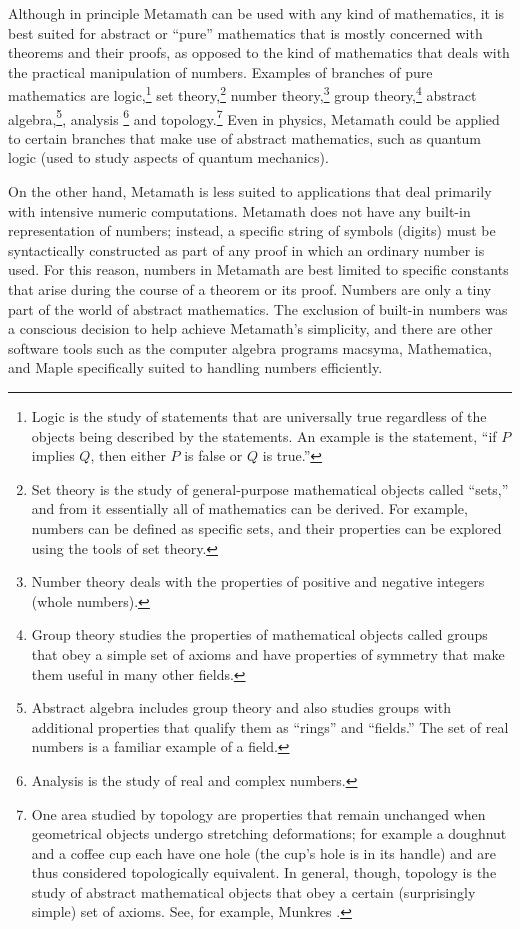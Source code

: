 Although in principle Metamath can be used with any
kind of mathematics, it is best suited for abstract or ``pure'' mathematics
that is mostly concerned with theorems and their proofs, as opposed to the
kind of mathematics that deals with the practical manipulation of numbers.
Examples of branches of pure mathematics are logic,\footnote{Logic
is the study of statements that are universally true regardless of the objects
being described by the statements.  An example is the statement, ``if $P$
implies $Q$, then either $P$ is false or $Q$ is true.''} set theory,\footnote{Set theory is the study of general-purpose mathematical objects called
``sets,'' and from it essentially all of mathematics can be derived.  For
example, numbers can be defined as specific sets, and their properties
can be explored using the tools of set theory.} number theory,\footnote{Number theory deals with the properties of positive and
negative integers (whole numbers).} group theory,\footnote{Group theory studies the properties of mathematical objects
called groups that obey a simple set of axioms and have properties of symmetry
that make them useful in many other fields.} abstract algebra,\footnote{Abstract algebra includes group theory and also studies
groups with additional properties that qualify them as ``rings'' and
``fields.''  The set of real numbers is a familiar example of a field.},
analysis \footnote{Analysis is
the study of real and complex numbers.} and
topology.\footnote{One area studied by topology are properties
that remain unchanged when geometrical objects undergo stretching
deformations; for example a doughnut and a coffee cup each have one hole (the
cup's hole is in its handle) and are thus considered topologically
equivalent.  In general, though, topology is the study of abstract
mathematical objects that obey a certain (surprisingly simple) set of axioms.
See, for example, Munkres \cite{Munkres}.} Even in
physics, Metamath could be applied to certain branches that make use of
abstract mathematics, such as quantum logic (used to study
aspects of quantum mechanics).

On the other hand, Metamath is less suited to applications
that deal primarily with intensive numeric computations.  Metamath does not
have any built-in representation of numbers; instead, a specific string of symbols (digits) must be syntactically
constructed as part of any proof in which an ordinary number is used.  For
this reason, numbers in Metamath are best limited to specific constants that
arise during the course of a theorem or its proof.  Numbers are only a tiny
part of the world of abstract mathematics.  The exclusion of built-in numbers
was a conscious decision to help achieve Metamath's simplicity, and there are
other software tools such as the computer algebra
programs {\sc
macsyma}, Mathematica, and
Maple specifically suited to handling numbers efficiently.


